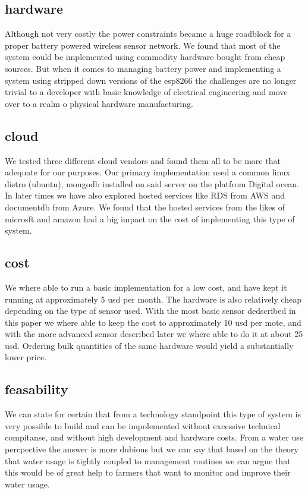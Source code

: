 \documentclass[]{uiophd}
\begin{document}
\subsection{hardware}
Although not very costly the power constraints became a huge roadblock for a proper battery powered wireless sensor network. We found that most of the system could be implemented using commodity hardware bought from cheap sources. But when it comes to managing battery power and implementing a system using stripped down versions of the esp8266 the challenges are no longer trivial to a developer with basic knowledge of electrical engineering and move over to a realm o physical hardware manufacturing.
\subsection{cloud}
We tested three different cloud vendors and found them all to be more that adequate for our purposes. Our primary implementation used a common linux distro (ubuntu), mongodb installed on said server on the platfrom Digital ocean. In later times we have also explored hosted services like RDS from AWS and documentdb from Azure. We found that the hosted services from the likes of microsft and amazon had a big impact on the cost of implementing this type of system.
\subsection{cost}
We where able to run a basic implementation for a low cost, and have kept it running at approximately 5 usd per month. The hardware is also relatively cheap depending on the type of sensor used. With the most basic sensor dedscribed in this paper we where able to keep the cost to approximately 10 usd per mote, and with the more advanced sensor described later we where able to do it at about 25 usd. Ordering bulk quantities of the same hardware would yield a substantially lower price.
\subsection{feasability}
We can state for certain that from a technology standpoint this type of system is very possible to build and can be impolemented without excessive technical compitanse, and without high development and hardware costs. From a water use percpective the answer is more dubious but we can say that based on the theory that water usage is tightly coupled to management routines we can argue that this would be of great help to farmers that want to monitor and improve their water usage.
\end{document}
